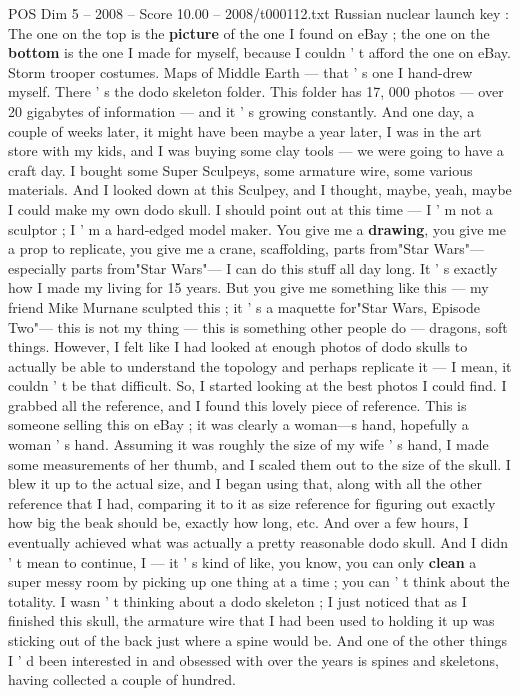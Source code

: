 \begin{textsample}{POS Dim 5 – 2008 – Score 10.00 – 2008/t000112.txt}
Russian nuclear launch key : The one on the top is the \textbf{picture} of the one I found on eBay ; the one on the \textbf{bottom} is the one I made for myself, because I couldn ' t afford the one on eBay.
Storm trooper costumes.
Maps of Middle Earth — that ' s one I hand-drew myself.
There ' s the dodo skeleton folder.
This folder has 17, 000 photos — over 20 gigabytes of information — and it ' s growing constantly.
And one day, a couple of weeks later, it might have been maybe a year later, I was in the art store with my kids, and I was buying some clay tools — we were going to have a craft day.
I bought some Super Sculpeys, some armature wire, some various materials.
And I looked down at this Sculpey, and I thought, maybe, yeah, maybe I could make my own dodo skull.
I should point out at this time — I ' m not a sculptor ; I ' m a hard-edged model maker.
You give me a \textbf{drawing}, you give me a prop to replicate, you give me a crane, scaffolding, parts from"Star Wars"— especially parts from"Star Wars"— I can do this stuff all day long.
It ' s exactly how I made my living for 15 years.
But you give me something like this — my friend Mike Murnane sculpted this ; it ' s a maquette for"Star Wars, Episode Two"— this is not my thing — this is something other people do — dragons, soft things.
However, I felt like I had looked at enough photos of dodo skulls to actually be able to understand the topology and perhaps replicate it — I mean, it couldn ' t be that difficult.
So, I started looking at the best photos I could find.
I grabbed all the reference, and I found this lovely piece of reference.
This is someone selling this on eBay ; it was clearly a woman—s hand, hopefully a woman ' s hand.
Assuming it was roughly the size of my wife ' s hand, I made some measurements of her thumb, and I scaled them out to the size of the skull.
I blew it up to the actual size, and I began using that, along with all the other reference that I had, comparing it to it as size reference for figuring out exactly how big the beak should be, exactly how long, etc.
And over a few hours, I eventually achieved what was actually a pretty reasonable dodo skull.
And I didn ' t mean to continue, I — it ' s kind of like, you know, you can only \textbf{clean} a super messy room by picking up one thing at a time ; you can ' t think about the totality.
I wasn ' t thinking about a dodo skeleton ; I just noticed that as I finished this skull, the armature wire that I had been used to holding it up was sticking out of the back just where a spine would be.
And one of the other things I ' d been interested in and obsessed with over the years is spines and skeletons, having collected a couple of hundred.

\end{textsample}
